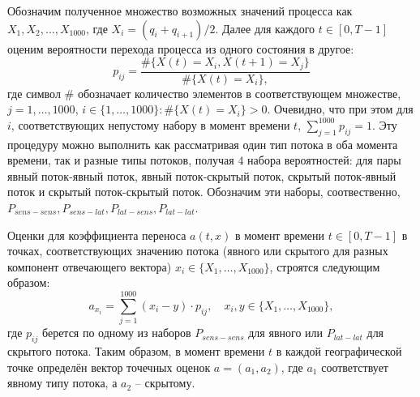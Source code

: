 Обозначим полученное множество возможных значений процесса как $X_1, X_2, \dots, X_{1000}$, где $X_i = (q_i + q_{i+1})/2$. Далее для каждого $t \in [0, T-1]$ оценим вероятности перехода процесса из одного состояния в другое:
\begin{equation}
	\label{p_formula}
	p_{ij} = \frac{\#\{X(t) = X_i, X(t+1) = X_j\}}{\#\{X(t) = X_i\},}
\end{equation}
где символ $\#$ обозначает количество элементов в соответствующем множестве, $j = 1,\ldots,1000$, $i \in \{1, \dots, 1000\}: \#\{X(t) = X_i\} > 0$. Очевидно, что при этом для $i$, соответствующих непустому набору в момент времени $t$, $\sum\limits_{j=1}^{1000} p_{ij} = 1$. Эту процедуру можно выполнить как рассматривая один тип потока в оба момента времени, так и разные типы потоков, получая $4$ набора вероятностей: для пары явный поток-явный поток, явный поток-скрытый поток, скрытый поток-явный поток и скрытый поток-скрытый поток. Обозначим эти наборы, соотвественно, $P_{sens-sens}, P_{sens-lat}, P_{lat-sens}, P_{lat-lat}$. 

Оценки для коэффициента переноса $a(t,x)$ в момент времени $t \in [0, T-1]$ в точках, соответствующих значению потока (явного или скрытого для разных компонент отвечающего вектора) $x_i \in \{X_1, \dots, X_{1000}\}$, строятся следующим образом:  
\begin{equation}
	\label{a_formula}
	a_{x_i} = \sum\limits_{j=1}^{1000} (x_i - y)\cdot p_{ij}, \quad x_i, y \in \{X_1, \dots, X_{1000}\}, 
\end{equation}
где $p_{ij}$ берется по одному из наборов $P_{sens-sens}$ для явного или $P_{lat-lat}$ для скрытого потока. Таким образом, в момент времени $t$ в каждой географической точке определён вектор точечных оценок $a = (a_1, a_2)$, где $a_1$ соответствует явному типу потока, а $a_2$ -- скрытому.

